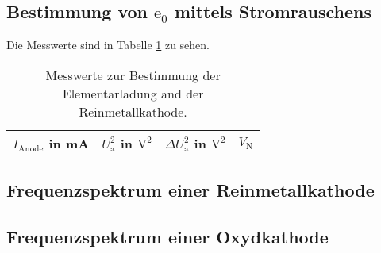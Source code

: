 	
	
\clearpage
\subsection{Bestimmung von $\text{e}_0$ mittels Stromrauschens}

	Die Messwerte sind in Tabelle \ref{tab:elementarladung} zu sehen.
	\begin{table}[h]
	\centering
		\begin{tabular}{cccc}
		\toprule \midrule
			$I_\text{Anode}$ in mA & $U^2_\text{a}$ in $\text{V}^2$ &
			$\Delta U_\text{a}^2$ in $\text{V}^2$ & $V_\text{N}$ \\
			\midrule
			
			\midrule \bottomrule
		\end{tabular}
		\caption{Messwerte zur Bestimmung der Elementarladung 
		and der Reinmetallkathode.}
		\label{tab:elementarladung}
	\end{table}
	

\subsection{Frequenzspektrum einer Reinmetallkathode}

\subsection{Frequenzspektrum einer Oxydkathode}
